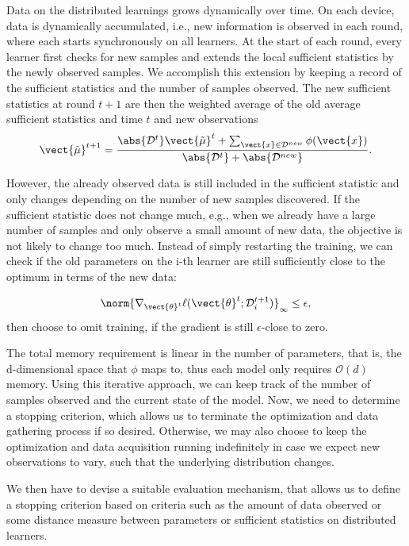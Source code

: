 Data on the distributed learnings grows dynamically over time.
On each device, data is dynamically accumulated, i.e., new information is observed in each round, where each starts synchronously on all learners.
At the start of each round, every learner first checks for new samples and extends the local sufficient statistics by the newly observed samples.
We accomplish this extension by keeping a record of the sufficient statistics and the number of samples observed.
The new sufficient statistics at round $t+1$ are then the weighted average of the old average sufficient statistics and time $t$ and new observations 
\begin{equation}
    \vect{\tilde{\mu}}^{t+1} = \frac{\abs{\mathcal{D}^{t}}\vect{\tilde{\mu}}^t + \sum_{\vect{x} \in \mathcal{D}^{new}} \phi(\vect{x})}{\abs{\mathcal{D}^{t}} + \abs{\mathcal{D}^{new}}}.
\end{equation}

However, the already observed data is still included in the sufficient statistic and only changes depending on the number of new samples discovered.
If the sufficient statistic does not change much, e.g., when we already have a large number of samples and only observe a small amount of new data, the objective is not likely to change too much. 
Instead of simply restarting the training, we can check if the old parameters on the i-th learner are still sufficiently close to the optimum in terms of the new data: 

\begin{equation}
    \norm{\nabla_{\vect{\theta}^t} \ell(\vect{\theta}^{t} ; \mathcal{D}_i^{t+1})}_{\infty} \leq \epsilon,
\end{equation}
then choose to omit training, if the gradient is still $\epsilon$-close to zero.

The total memory requirement is linear in the number of parameters, that is, the d-dimensional space that $\phi$ maps to, thus each model only requires $\mathcal{O}(d)$ memory.
Using this iterative approach, we can keep track of the number of samples observed and the current state of the model.
Now, we need to determine a stopping criterion, which allows us to terminate the optimization and data gathering process if so desired. 
Otherwise, we may also choose to keep the optimization and data acquisition running indefinitely in case we expect new observations to vary, such that the underlying distribution changes.

We then have to devise a suitable evaluation mechanism, that allows us to define a stopping criterion based on criteria such as the amount of data observed or some distance measure between parameters or sufficient statistics on distributed learners.

